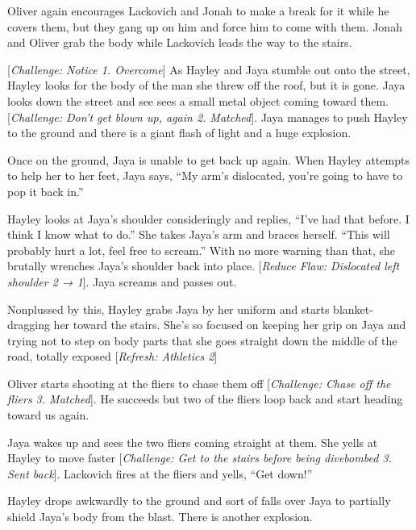 Oliver again encourages Lackovich and Jonah to make a break for it while he covers them, but they gang up on him and force him to come with them.  Jonah and Oliver grab the body while Lackovich leads the way to the stairs.



{[}\textit{Challenge: Notice 1. Overcome}{]} As Hayley and Jaya stumble out onto the street, Hayley looks for the body of the man she threw off the roof, but it is gone.  Jaya looks down the street and see sees a small metal object coming toward them.  {[}\textit{Challenge: Don't get blown up, again 2. Matched}{]}.  Jaya manages to push Hayley to the ground and there is a giant flash of light and a huge explosion.



Once on the ground, Jaya is unable to get back up again.  When Hayley attempts to help her to her feet, Jaya says, ``My arm's dislocated, you're going to have to pop it back in.''

Hayley looks at Jaya's shoulder consideringly and replies, ``I've had that before.  I think I know what to do.''  She takes Jaya's arm and braces herself.  ``This will probably hurt a lot, feel free to scream.''  With no more warning than that, she brutally wrenches Jaya's shoulder back into place. {[}\textit{Reduce Flaw: Dislocated left shoulder 2 → 1}{]}.  Jaya screams and passes out.



Nonplussed by this, Hayley grabs Jaya by her uniform and starts blanket-dragging her toward the stairs.  She's so focused on keeping her grip on Jaya and trying not to step on body parts that she goes straight down the middle of the road, totally exposed {[}\textit{Refresh: Athletics 2}{]}



Oliver starts shooting at the fliers to chase them off {[}\textit{Challenge: Chase off the fliers 3. Matched}{]}.  He succeeds but two of the fliers loop back and start heading toward us again. 



Jaya wakes up and sees the two fliers coming straight at them.  She yells at Hayley to move faster {[}\textit{Challenge: Get to the stairs before being divebombed 3. Sent back}{]}.  Lackovich fires at the fliers and yells, ``Get down!''



Hayley drops awkwardly to the ground and sort of falls over Jaya to partially shield Jaya's body from the blast.  There is another explosion.



